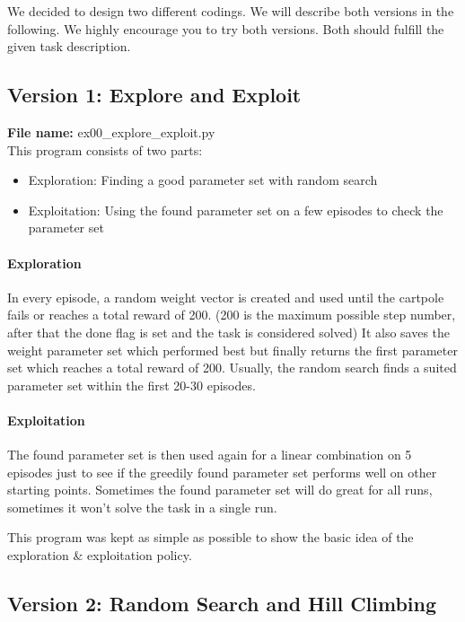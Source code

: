 \documentclass[a4paper, 11pt]{article}
\begin{document}
We decided to design two different codings. We will describe both versions in the following. We highly encourage you to try both versions. Both should fulfill the given task description.

\subsection{Version 1: Explore and Exploit}

\textbf{File name:} ex00\_explore\_exploit.py\\
This program consists of two parts:
\begin{itemize}
	\item Exploration: Finding a good parameter set with random search
	\item Exploitation: Using the found parameter set on a few episodes to check the parameter set
\end{itemize}

\paragraph{Exploration}

In every episode, a random weight vector is created and used until the cartpole fails or reaches a total reward of 200. (200 is the maximum possible step number, after that the done flag is set and the task is considered solved) It also saves the weight parameter set which performed best but finally returns the first parameter set which reaches a total reward of 200.
Usually, the random search finds a suited parameter set within the first 20-30 episodes.

\paragraph{Exploitation}

The found parameter set is then used again for a linear combination on 5 episodes just to see if the greedily found parameter set performs well on other starting points.
Sometimes the found parameter set will do great for all runs, sometimes it won’t solve the task in a single run.

This program was kept as simple as possible to show the basic idea of the exploration \& exploitation policy.
\clearpage

\subsection{Version 2: Random Search and Hill Climbing}
\end{document}
